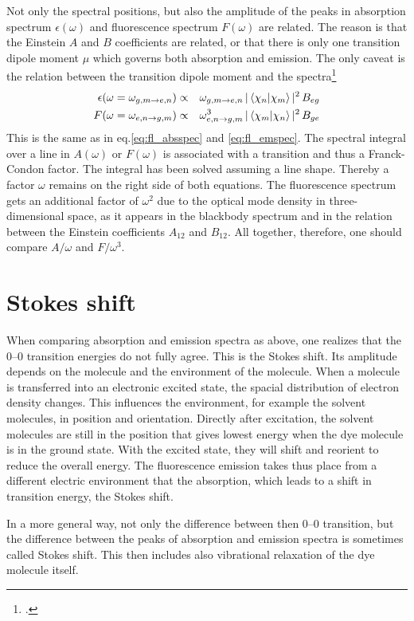 Not only the spectral positions, but also the amplitude of the peaks in absorption spectrum $\epsilon(\omega)$ and fluorescence spectrum $F(\omega)$ are related. The reason is that the Einstein $A$ and $B$ coefficients are related, or that there is only one transition dipole moment $\mu$ which governs both absorption and emission. The only caveat is the relation between the transition dipole moment and the spectra\footcite[Chapter 5.2]{Parson}
\begin{eqnarray}
   \epsilon(\omega  =  \omega_{g,m \rightarrow e,n} )  & \propto & \omega_{g,m \rightarrow e,n}  \,  | \braket{\chi_n |  \chi_m} |^2 
\, B_{eg} \\
   F(\omega =  \omega_{e,n \rightarrow g,m} ) & \propto & \omega_{e,n \rightarrow g,m}^3 \,  | \braket{\chi_m |  \chi_n} |^2 
\, B_{ge}
\end{eqnarray} 
This is the same as in eq.\ref{eq:fl_absspec} and \ref{eq:fl_emspec}.
The spectral integral over a line in $A(\omega )$ or $F(\omega)$ is associated with a transition and thus a Franck-Condon factor. The integral has been solved assuming a line shape. Thereby a factor $\omega$ remains on the right side of both equations. The fluorescence spectrum gets an additional factor of $\omega^2$ due to the optical mode density in three-dimensional space, as it appears in the blackbody spectrum and in the relation between the Einstein coefficients $A_{12}$ and $B_{12}$.
All together, therefore, one should compare $A / \omega$ and $F / \omega^3$.



\section{Stokes shift}

When comparing absorption and emission spectra as above, one realizes that the  0--0 transition  energies do not fully agree. This is the Stokes shift. Its amplitude depends on the molecule and the environment of the molecule. When a molecule is transferred into an electronic excited state, the spacial distribution of electron density changes. This influences the environment, for example the solvent molecules, in position and orientation. Directly after excitation, the solvent molecules are still in the position that gives lowest energy when the dye molecule is in the ground state. With the excited state, they will shift and reorient to reduce the overall energy. The fluorescence emission takes thus place from a different electric environment that the absorption, which leads to a shift in transition energy, the Stokes shift.

In a more general way, not only the difference between then 0--0 transition, but the difference between the peaks of absorption and emission spectra is sometimes called Stokes shift. This then includes also vibrational relaxation of the dye molecule itself.





\printbibliography[segment=\therefsegment,heading=subbibliography]
